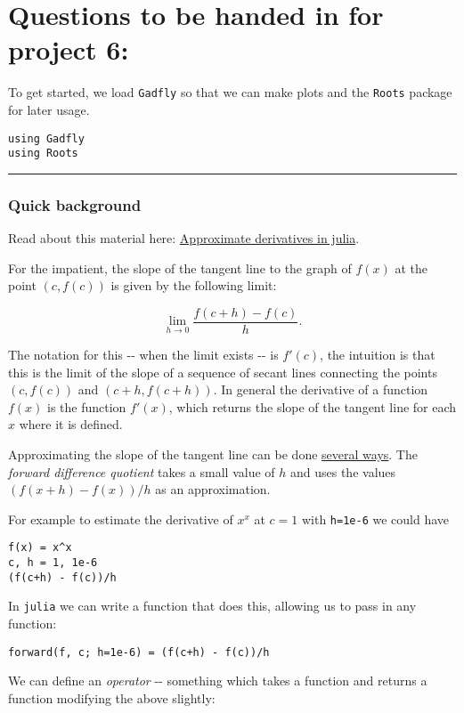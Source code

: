 \documentclass[12pt]{article}
\begin{document}
\section{Questions to be handed in for project 6:}

To get started, we load \texttt{Gadfly} so that we can make plots and
the \texttt{Roots} package for later usage.



\begin{verbatim}
using Gadfly            
using Roots
\end{verbatim}
\begin{center}\rule{3in}{0.4pt}\end{center}

\subsubsection{Quick background}

Read about this material here:
\href{http://mth229.github.io/derivatives.html}{Approximate derivatives
in julia}.

For the impatient, the slope of the tangent line to the graph of $f(x)$
at the point $(c,f(c))$ is given by the following limit:

\[
\lim_{h \rightarrow 0} \frac{f(c + h) - f(c)}{h}.
\]

The notation for this -{}- when the limit exists -{}- is $f'(c)$, the
intuition is that this is the limit of the slope of a sequence of secant
lines connecting the points $(c, f(c))$ and $(c+h, f(c+h))$. In general
the derivative of a function $f(x)$ is the function $f'(x)$, which
returns the slope of the tangent line for each $x$ where it is defined.

Approximating the slope of the tangent line can be done
\href{XXX}{several ways}. The \emph{forward difference quotient} takes a
small value of $h$ and uses the values $(f(x+h) - f(x))/h$ as an
approximation.

For example to estimate the derivative of $x^x$ at $c=1$ with
\texttt{h=1e-6} we could have



\begin{verbatim}
f(x) = x^x
c, h = 1, 1e-6
(f(c+h) - f(c))/h
\end{verbatim}
In \texttt{julia} we can write a function that does this, allowing us to
pass in any function:



\begin{verbatim}
forward(f, c; h=1e-6) = (f(c+h) - f(c))/h
\end{verbatim}
We can define an \emph{operator} -{}- something which takes a function
and returns a function modifying the above slightly:
\end{document}
